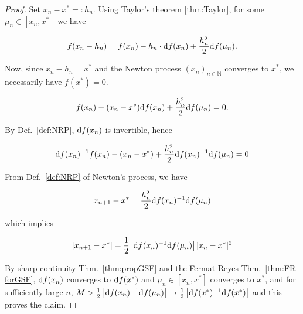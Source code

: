 \documentclass[10pt,a4paper]{amsart}
\newcommand{\N}{\field{N}} %
\newcommand{\diff}[1]{\ifmmode\mathchoice{\hbox{\rm d}#1}  %
 {\hbox{\rm d}#1}  %
 {\scalebox{0.75}{$\hbox{\rm d}#1$}}  %
 {\scalebox{0.35}{$\hbox{\rm d}#1$}}  %
 \fi} %
\newcommand{\field}[1]{\mathbb{#1}}
\begin{document}
\begin{proof}
Set $x_{n}-x^{*}=:h_{n}$. Using Taylor's theorem \ref{thm:Taylor},
for some $\mu_{n}\in[x_{n},x^{*}]$ we have

\[
f(x_{n}-h_{n})=f(x_{n})-h_{n}\cdot\diff f(x_{n})+\frac{h_{n}^{2}}{2}\diff f(\mu_{n}).
\]

\noindent Now, since $x_{n}-h_{n}=x^{*}$ and the Newton process $(x_{n})_{n\in\N}$
converges to $x^{*}$, we necessarily have $f(x^{*})=0$.

\[
f(x_{n})-(x_{n}-x^{*})\diff f(x_{n})+\frac{h_{n}^{2}}{2}\diff f(\mu_{n})=0.
\]

\noindent By Def.~\ref{def:NRP}, $\diff f(x_{n})$ is invertible,
hence

\[
\diff f(x_{n})^{-1}f(x_{n})-(x_{n}-x^{*})+\frac{h_{n}^{2}}{2}\diff f(x_{n})^{-1}\diff f(\mu_{n})=0
\]

\noindent From Def.~\ref{def:NRP} of Newton's process, we have

\[
x_{n+1}-x^{*}=\frac{h_{n}^{2}}{2}\diff f(x_{n})^{-1}\diff f(\mu_{n})
\]

\noindent which implies

\[
|x_{n+1}-x^{*}|=\frac{1}{2}\left|\diff f(x_{n})^{-1}\diff f(\mu_{n})\right||x_{n}-x^{*}|^{2}
\]

\noindent By sharp continuity Thm.~\ref{thm:propGSF} and the Fermat-Reyes
Thm.~\ref{thm:FR-forGSF}, $\diff f(x_{n})$ converges to $\diff f(x^{*})$
and $\mu_{n}\in[x_{n},x^{*}]$ converges to $x^{*}$, and for sufficiently
large $n$, $M>\frac{1}{2}\left|\diff f(x_{n})^{-1}\diff f(\mu_{n})\right|\to\frac{1}{2}\left|\diff f(x^{*})^{-1}\diff f(x^{*})\right|$
and this proves the claim.
\end{proof}
\end{document}
